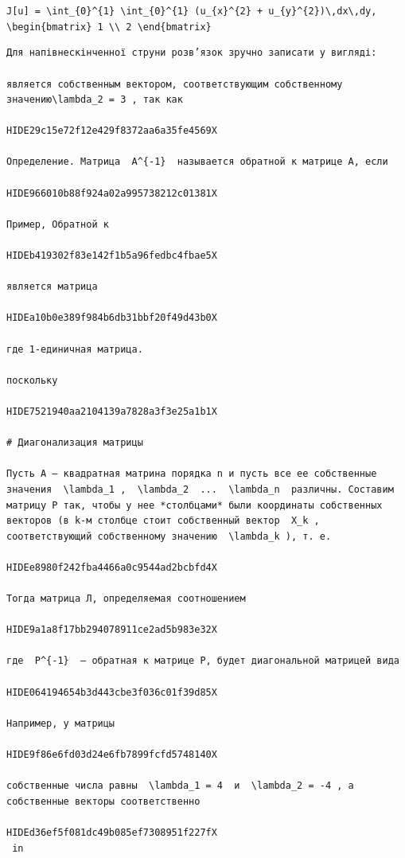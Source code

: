 \documentclass[
  ukrainian,
]{article}
\begin{document}
\texttt{J{[}u{]}\ =\ \textbackslash{}int\_\{0\}\^{}\{1\}\ \textbackslash{}int\_\{0\}\^{}\{1\}\ (u\_\{x\}\^{}\{2\}\ +\ u\_\{y\}\^{}\{2\})\textbackslash{},dx\textbackslash{},dy,}
\texttt{\textbackslash{}begin\{bmatrix\}\ 1\ \textbackslash{}\textbackslash{}\ 2\ \textbackslash{}end\{bmatrix\}}

\begin{verbatim}
Для напівнескінченної струни розв’язок зручно записати у вигляді:

является собственным вектором, соответствующим собственному значению\lambda_2 = 3 , так как

HIDE29c15e72f12e429f8372aa6a35fe4569X

Определение. Матрица  A^{-1}  называется обратной к матрице A, если

HIDE966010b88f924a02a995738212c01381X

Пример, Обратной к

HIDEb419302f83e142f1b5a96fedbc4fbae5X

является матрица

HIDEa10b0e389f984b6db31bbf20f49d43b0X

где 1-единичная матрица.

поскольку

HIDE7521940aa2104139a7828a3f3e25a1b1X

# Диагонализация матрицы

Пусть A — квадратная матрина порядка n и пусть все ее собственные значения  \lambda_1 ,  \lambda_2  ...  \lambda_n  различны. Составим матрицу P так, чтобы у нее *столбцами* были координаты собственных векторов (в k-м столбце стоит собственный вектор  X_k , соответствующий собственному значению  \lambda_k ), т. е.

HIDEe8980f242fba4466a0c9544ad2bcbfd4X

Тогда матрица Л, определяемая соотношением

HIDE9a1a8f17bb294078911ce2ad5b983e32X

где  P^{-1}  — обратная к матрице P, будет диагональной матрицей вида

HIDE064194654b3d443cbe3f036c01f39d85X

Например, у матрицы

HIDE9f86e6fd03d24e6fb7899fcfd5748140X

собственные числа равны  \lambda_1 = 4  и  \lambda_2 = -4 , а собственные векторы соответственно

HIDEd36ef5f081dc49b085ef7308951f227fX
 in
\end{verbatim}
\end{document}
